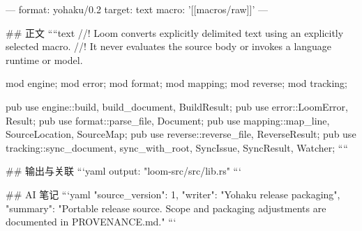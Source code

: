 ---
format: yohaku/0.2
target: text
macro: '[[macros/raw]]'
---

## 正文
````text
//! Loom converts explicitly delimited text using an explicitly selected macro.
//! It never evaluates the source body or invokes a language runtime or model.

mod engine;
mod error;
mod format;
mod mapping;
mod reverse;
mod tracking;

pub use engine::{build, build_document, BuildResult};
pub use error::{LoomError, Result};
pub use format::{parse_file, Document};
pub use mapping::{map_line, SourceLocation, SourceMap};
pub use reverse::{reverse_file, ReverseResult};
pub use tracking::{sync_document, sync_with_root, SyncIssue, SyncResult, Watcher};
````

## 输出与关联
```yaml
output: "loom-src/src/lib.rs"
```

## AI 笔记
```yaml
{"source_version": 1, "writer": "Yohaku release packaging", "summary": "Portable release source. Scope and packaging adjustments are documented in PROVENANCE.md."}
```
